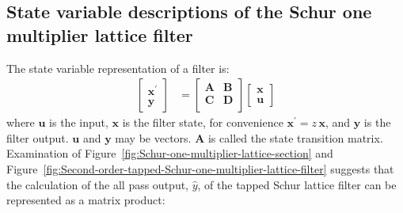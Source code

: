 \documentclass[a4paper,twoside,10pt,english]{article}
\begin{document}
\subsection{State variable descriptions of the Schur one multiplier lattice filter}
The state variable representation of a filter is:
\begin{align}
\left[\begin{array}{c}
\mathbf{x}^{\prime}\\
\mathbf{y}\end{array}\right] &= \left[\begin{array}{cc}
    \mathbf{A} & \mathbf{B} \\
    \mathbf{C} & \mathbf{D} \\
\end{array}\right]\left[\begin{array}{c}
\mathbf{x}\\
\mathbf{u}\end{array}\right]
\label{eqn:State-variable-representation}
\end{align}
where $\mathbf{u}$ is the input, $\mathbf{x}$ is the filter state, for
convenience $\mathbf{x}^{\prime}=z\,\mathbf{x}$, and $\mathbf{y}$ is the filter
output. $\mathbf{u}$ and $\mathbf{y}$ may be vectors. $\mathbf{A}$ is called
the state transition matrix.
Examination of Figure~\ref{fig:Schur-one-multiplier-lattice-section} and
Figure~\ref{fig:Second-order-tapped-Schur-one-multiplier-lattice-filter}
suggests that the calculation of the all pass output, $\hat{y}$, of the
tapped Schur lattice filter can be represented as a matrix product:
\end{document}
